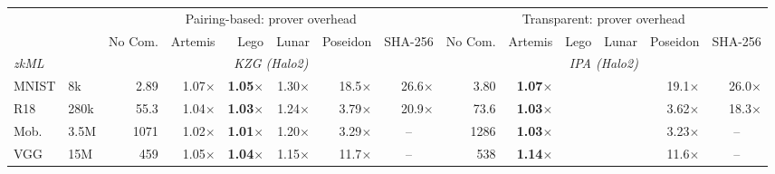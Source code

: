 \providecommand{\cpFill}{\ifdefined\cellcolor\cellcolor{gray!15}\fi}
\providecommand{\cpFillLegend}{\ifdefined\cellcolor\colorbox{gray!15}{\strut\itshape shaded}\else\textit{grey text}\fi}
\providecommand{\cpUnsupported}[1]{{\color{black!65}\footnotesize\itshape #1}}
\providecommand{\cpUnsupportedShort}{{\color{black!65}$\bot$}}
\providecommand{\cpNotImpl}[1]{{\color{gray}\footnotesize\itshape #1}}
\providecommand{\cpNotImplShort}{{\color{black!65}$\bot$}}
\providecommand{\cpNotRun}{{\color{gray}--}}
\begin{table}[t]
\centering
\small
\setlength{\tabcolsep}{2.5pt}
\begin{tabular}{ll@{\hspace{6.0pt}}rrrrrr@{\hspace{6.0pt}}rrrrrr}
\toprule
 &  & \multicolumn{6}{c}{Pairing-based: prover overhead} & \multicolumn{6}{c}{Transparent: prover overhead} \\
\cmidrule(lr){3-8} \cmidrule(lr){9-14}
 &  & No Com. & Artemis & Lego & Lunar & Poseidon & SHA-256 & No Com. & Artemis & Lego & Lunar & Poseidon & SHA-256 \\
\midrule
\multicolumn{2}{l}{\textit{zkML}} & \multicolumn{6}{c}{\textit{KZG (Halo2)}} & \multicolumn{6}{c}{\textit{IPA (Halo2)}} \\
\cmidrule(lr){3-14}
MNIST & {\scriptsize 8k} & 2.89 & 1.07$\times$ & \textbf{1.05$\times$} & 1.30$\times$ & 18.5$\times$ & 26.6$\times$ & 3.80 & \textbf{1.07$\times$} & \multicolumn{2}{c}{\cpFill} & 19.1$\times$ & 26.0$\times$ \\
R18 & {\scriptsize 280k} & 55.3 & 1.04$\times$ & \textbf{1.03$\times$} & 1.24$\times$ & 3.79$\times$ & 20.9$\times$ & 73.6 & \textbf{1.03$\times$} & \multicolumn{2}{c}{\cpFill} & 3.62$\times$ & 18.3$\times$ \\
Mob. & {\scriptsize 3.5M} & 1071 & 1.02$\times$ & \textbf{1.01$\times$} & 1.20$\times$ & 3.29$\times$ & \multicolumn{1}{c}{\cpNotRun} & 1286 & \textbf{1.03$\times$} & \multicolumn{2}{c}{\cpFill} & 3.23$\times$ & \multicolumn{1}{c}{\cpNotRun} \\
VGG & {\scriptsize 15M} & 459 & 1.05$\times$ & \textbf{1.04$\times$} & 1.15$\times$ & 11.7$\times$ & \multicolumn{1}{c}{\cpNotRun} & 538 & \textbf{1.14$\times$} & \multicolumn{2}{c}{\cpFill} & 11.6$\times$ & \multicolumn{1}{c}{\cpNotRun} \\

\end{tabular}
\end{table}

